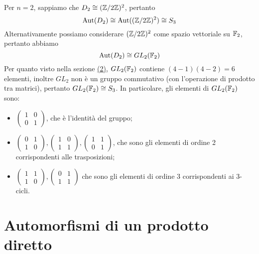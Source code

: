\documentclass[11pt]{scrartcl}
\begin{document}
Per $n = 2$, sappiamo che $D_2 \cong (\mathbb{Z}/{2}\mathbb{Z})^2$, pertanto 
\[
    \operatorname{Aut}(D_2) \cong \operatorname{Aut}((\mathbb{Z}/{2}\mathbb{Z})^2) \cong S_3
\]
Alternativamente possiamo considerare $(\mathbb{Z}/{2}\mathbb{Z})^2$ come spazio vettoriale su $\mathbb F_2$,
pertanto abbiamo 
\[
    \operatorname{Aut}(D_2) \cong GL_2(\mathbb F_2)
\]Per quanto visto nella sezione \hyperref[aut sp vet]{(2)}, $GL_2(\mathbb F_2)$ 
contiene $(4 - 1)(4 - 2) = 6$ elementi, inoltre $GL_2$ non è un gruppo 
commutativo (con l'operazione di prodotto tra matrici), pertanto $GL_2(\mathbb F_2) \cong S_3$.
In particolare, gli elementi di $GL_2(\mathbb F_2)$ sono:
\begin{itemize}
    \item $\begin{pmatrix}
    1 & 0\\
    0 & 1
    \end{pmatrix}$, che è l'identità del gruppo;
    \item $\begin{pmatrix}
    0 & 1\\
    1 & 0
    \end{pmatrix}, \begin{pmatrix}
        1 & 0\\
        1 & 1
    \end{pmatrix}, \begin{pmatrix}
        1 & 1\\
        0 & 1
    \end{pmatrix}$, che sono gli elementi di ordine 2 corrispondenti alle 
    trasposizioni;
    \item $\begin{pmatrix}
    1 & 1\\
    1 & 0
    \end{pmatrix}, \begin{pmatrix}
        0 & 1\\
        1 & 1
    \end{pmatrix}$ che sono gli elementi di ordine $3$ corrispondenti ai $3$-cicli.
\end{itemize}

\newpage

\section{Automorfismi di un prodotto diretto}
\end{document}

